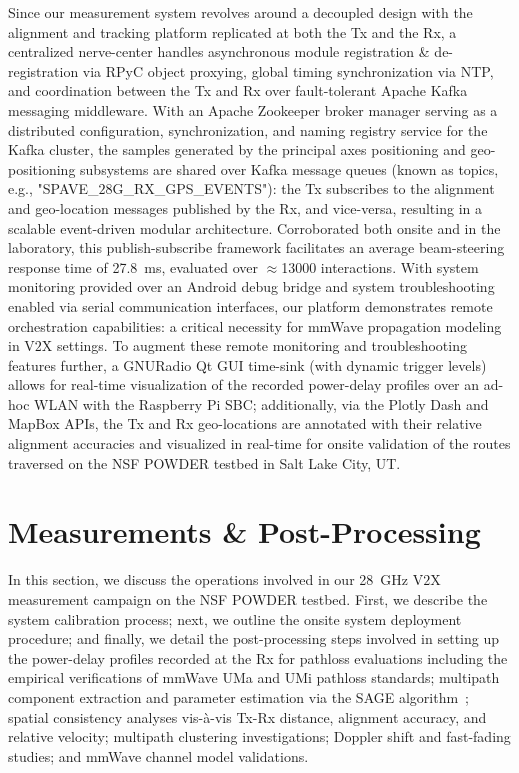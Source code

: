 \documentclass[12pt, draftcls, onecolumn]{IEEEtran}
\begin{document}
Since our measurement system revolves around a decoupled design with the alignment and tracking platform replicated at both the Tx and the Rx, a centralized nerve-center handles asynchronous module registration \& de-registration via RPyC object proxying, global timing synchronization via NTP, and coordination between the Tx and Rx over fault-tolerant Apache Kafka messaging middleware. With an Apache Zookeeper broker manager serving as a distributed configuration, synchronization, and naming registry service for the Kafka cluster, the samples generated by the principal axes positioning and geo-positioning subsystems are shared over Kafka message queues (known as topics, e.g., "SPAVE\_$28$G\_RX\_GPS\_EVENTS"): the Tx subscribes to the alignment and geo-location messages published by the Rx, and vice-versa, resulting in a scalable event-driven modular architecture. Corroborated both onsite and in the laboratory, this publish-subscribe framework facilitates an average beam-steering response time of \SI{27.8}{\milli\second}, evaluated over ${\approx}$\SI{13000}{} interactions. With system monitoring provided over an Android debug bridge and system troubleshooting enabled via serial communication interfaces, our platform demonstrates remote orchestration capabilities: a critical necessity for mmWave propagation modeling in V$2$X settings. To augment these remote monitoring and troubleshooting features further, a GNURadio Qt GUI time-sink (with dynamic trigger levels) allows for real-time visualization of the recorded power-delay profiles over an ad-hoc WLAN with the Raspberry Pi SBC; additionally, via the Plotly Dash and MapBox APIs, the Tx and Rx geo-locations are annotated with their relative alignment accuracies and visualized in real-time for onsite validation of the routes traversed on the NSF POWDER testbed in Salt Lake City, UT.
\vspace{-3mm}

\section{Measurements \& Post-Processing}\label{S3}
In this section, we discuss the operations involved in our \SI{28}{\giga\hertz} V$2$X measurement campaign on the NSF POWDER testbed. First, we describe the system calibration process; next, we outline the onsite system deployment procedure; and finally, we detail the post-processing steps involved in setting up the power-delay profiles recorded at the Rx for pathloss evaluations including the empirical verifications of mmWave UMa and UMi pathloss standards; multipath component extraction and parameter estimation via the SAGE algorithm~\cite{SAGE}; spatial consistency analyses vis-\`{a}-vis Tx-Rx distance, alignment accuracy, and relative velocity; multipath clustering investigations; Doppler shift and fast-fading studies; and mmWave channel model validations.
\end{document}
